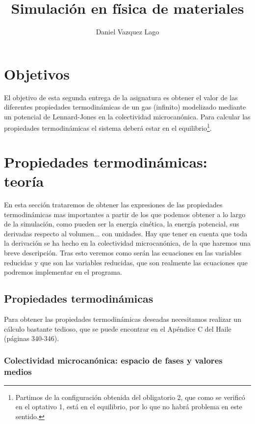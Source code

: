 \documentclass[11pt]{article} %
\author{Daniel Vazquez Lago}
\title{Simulación en física de materiales}
\begin{document}
	
	
\maketitle
\newpage
\tableofcontents

\setlength{\parskip}{1.5mm} %


	
\section{Objetivos}


El objetivo de esta segunda entrega de la asignatura es obtener el valor de las diferentes propiedades termodinámicas de un gas (infinito) modelizado mediante un potencial de Lennard-Jones en la colectividad microcanónica. Para calcular las propiedades termodinámicas el sistema deberá estar en el equilibrio\footnote{Partimos de la configuración obtenida del obligatorio 2, que como se verificó en el optativo 1, está en el equilibrio, por lo que no habrá problema en este sentido.}. 


\section{Propiedades termodinámicas: teoría}

En esta sección trataremos de obtener las expresiones de las propiedades termodinámicas mas importantes a partir de los que podemos obtener a lo largo de la simulación, como pueden ser la energía cinética, la energía potencial, sus derivadas respecto al volumen... con unidades. Hay que tener en cuenta que toda la derivación se ha hecho en la colectividad microcanónica, de la que haremos una breve descripción. Tras esto veremos como serán las ecuaciones en las variables reducidas y que son las variables reducidas, que son realmente las ecuaciones que podremos implementar en el programa. 

\subsection{Propiedades termodinámicas}

Para obtener las propiedades termodinámicas deseadas necesitamos realizar un cálculo bastante tedioso, que se puede encontrar en el Apéndice C del Haile \cite{Haile} (páginas 340-346). 

\subsubsection{Colectividad microcanónica: espacio de fases y valores medios}
\end{document}
